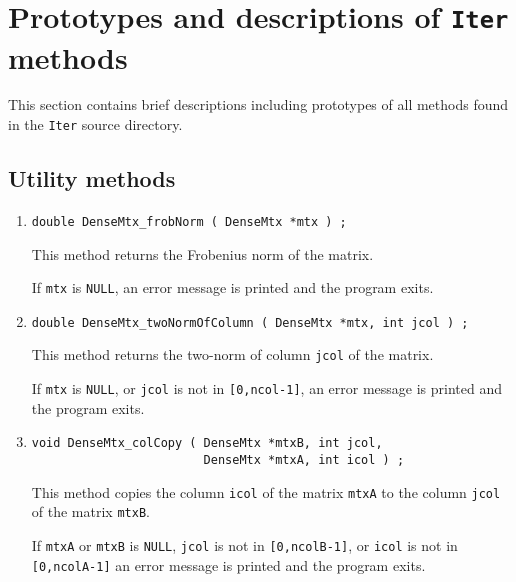 \par
\section{Prototypes and descriptions of {\tt Iter} methods}
\label{section:Iter:proto}
\par
This section contains brief descriptions including prototypes
of all methods found in the {\tt Iter} source directory.
\par

%
%
\subsection{Utility methods}
\label{subsection:Iter:proto:utility}
\par
\begin{enumerate}

\item
\begin{verbatim}
double DenseMtx_frobNorm ( DenseMtx *mtx ) ;
\end{verbatim}
\par
This method returns the Frobenius norm of the matrix.
\par {}
If {\tt mtx} is {\tt NULL},
an error message is printed and the program exits.

\item
\begin{verbatim}
double DenseMtx_twoNormOfColumn ( DenseMtx *mtx, int jcol ) ;
\end{verbatim}
\par
This method returns the two-norm of column {\tt jcol} of the matrix.
\par {}
If {\tt mtx} is {\tt NULL}, or {\tt jcol} is not in {\tt [0,ncol-1]},
an error message is printed and the program exits.

\item
\begin{verbatim}
void DenseMtx_colCopy ( DenseMtx *mtxB, int jcol, 
                        DenseMtx *mtxA, int icol ) ;
\end{verbatim}
\par
This method copies the column {\tt icol} of the matrix {\tt mtxA}
to the column {\tt jcol} of the matrix {\tt mtxB}.
\par {}
If {\tt mtxA} or {\tt mtxB} is {\tt NULL}, {\tt jcol} is not in 
{\tt [0,ncolB-1]}, or {\tt icol} is not in {\tt [0,ncolA-1]} 
an error message is printed and the program exits.


\end{enumerate}
